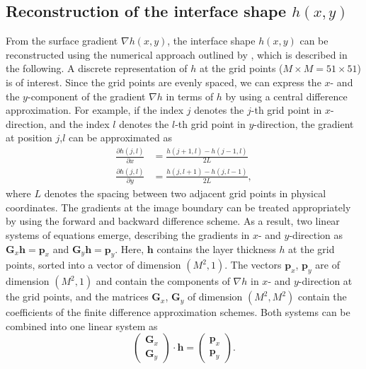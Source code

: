 \documentclass{jfm_arxiv}
\renewcommand\vec{\mathbf}
\newcommand{\matr}[1]{\bm{#1}}     %
\begin{document}
\subsection{Reconstruction of the interface shape $h(x,y)$}

From the surface gradient $\nabla h(x,y)$, the interface shape $h(x,y)$ can be reconstructed using the numerical approach outlined by \citet{Moisy2009}, which is described in the following.
A discrete representation of $h$ at the grid points ($M\times M = 51 \times 51$) is of interest. Since the grid points are evenly spaced, we can express the $x$- and the $y$-component of the gradient $\nabla h$ in terms of $h$ by using a central difference approximation. For example, if the index $j$ denotes the $j$-th grid point in $x$-direction, and the index $l$ denotes the $l$-th grid point in $y$-direction, the gradient at position $j$,$l$ can be approximated as 
\begin{align}
\frac{\partial h (j,l)}{\partial x}  &= \frac{h(j+1,l) - h(j-1,l)}{2 L} \label{eq:ExpDetails_h_centereddiff_x}\\
\frac{\partial h (j,l)}{\partial y}  &= \frac{h(j,l+1) - h(j,l-1)}{2 L}\label{eq:ExpDetails_h_centereddiff_y}, 
\end{align}
where $L$ denotes the spacing between two adjacent grid points in physical coordinates.
The gradients at the image boundary can be treated appropriately by using the forward and backward difference scheme. As a result, two linear systems of equations emerge, describing the gradients in $x$- and $y$-direction as $\matr{G}_x \vec{h} = \vec{p}_x$ and  $\matr{G}_y \vec{h} = \vec{p}_y$. Here, $\vec{h}$ contains the layer thickness $h$ at the grid points, sorted into a vector of dimension $(M^2,1)$. The vectors $\vec{p}_x$, $\vec{p}_y$ are of dimension $(M^2,1)$ and contain the components of $\nabla h$ in $x$- and $y$-direction at the grid points, and the matrices $\matr{G}_x $, $\matr{G}_y$ of dimension $(M^2,M^2)$ contain the coefficients of the finite difference approximation schemes. Both systems can be combined into one linear system as 
\begin{equation}
\label{eq:ExpDetails_h_fullproblem}
\begin{pmatrix} \matr{G}_x \\ \matr{G}_y \end{pmatrix} 
\cdot \vec{h} = 
\begin{pmatrix} \vec{p}_x \\ \vec{p}_y \end{pmatrix}.
\end{equation}
\end{document}
